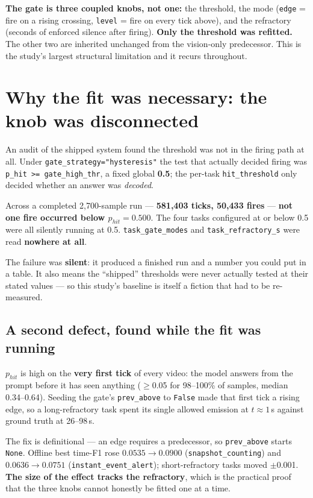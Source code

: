 \documentclass[11pt,a4paper]{article}
\newenvironment{keybox}{\begin{shaded}\noindent}{\end{shaded}}
\begin{document}
\medskip
\noindent\textbf{The gate is three coupled knobs, not one:} the threshold, the mode
(\texttt{edge} = fire on a rising crossing, \texttt{level} = fire on every tick
above), and the refractory (seconds of enforced silence after firing). \textbf{Only
the threshold was refitted.} The other two are inherited unchanged from the
vision-only predecessor. This is the study's largest structural limitation and it
recurs throughout.

\section{Why the fit was necessary: the knob was disconnected}

An audit of the shipped system found the threshold was not in the firing path at
all. Under \texttt{gate\_strategy="hysteresis"} the test that actually decided
firing was \texttt{p\_hit >= gate\_high\_thr}, a fixed global \textbf{0.5}; the
per-task \texttt{hit\_threshold} only decided whether an answer was \emph{decoded}.

Across a completed 2{,}700-sample run --- \textbf{581{,}403 ticks, 50{,}433 fires}
--- \textbf{not one fire occurred below $p_{hit}=0.500$}. The four tasks configured
at or below 0.5 were all silently running at 0.5. \texttt{task\_gate\_modes} and
\texttt{task\_refractory\_s} were read \textbf{nowhere at all}.

\begin{keybox}
The failure was \textbf{silent}: it produced a finished run and a number you could
put in a table. It also means the ``shipped'' thresholds were never actually tested
at their stated values --- so this study's baseline is itself a fiction that had to
be re-measured.
\end{keybox}

\subsection{A second defect, found while the fit was running}

$p_{hit}$ is high on the \textbf{very first tick} of every video: the model answers
from the prompt before it has seen anything ($\ge$0.05 for 98--100\% of samples,
median 0.34--0.64). Seeding the gate's \texttt{prev\_above} to \texttt{False} made
that first tick a rising edge, so a long-refractory task spent its single allowed
emission at $t\approx1$\,s against ground truth at 26--98\,s.

The fix is definitional --- an edge requires a predecessor, so \texttt{prev\_above}
starts \texttt{None}. Offline best time-F1 rose $0.0535\rightarrow0.0900$
(\texttt{snapshot\_counting}) and $0.0636\rightarrow0.0751$
(\texttt{instant\_event\_alert}); short-refractory tasks moved $\pm$0.001.
\textbf{The size of the effect tracks the refractory}, which is the practical proof
that the three knobs cannot honestly be fitted one at a time.
\end{document}
